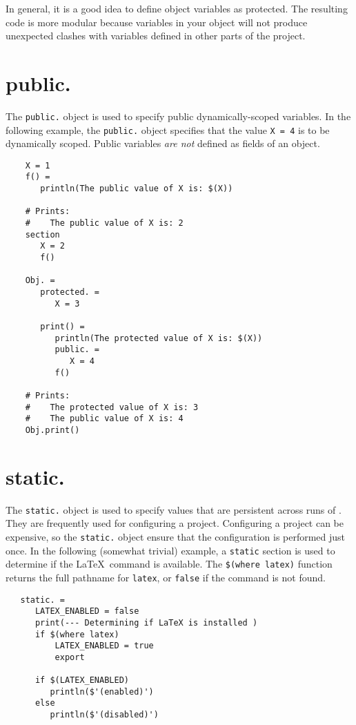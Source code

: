 In general, it is a good idea to define object variables as protected.  The resulting code is more
modular because variables in your object will not produce unexpected clashes with variables defined
in other parts of the project.

\section{public.}
\label{section:public}

The \verb+public.+ object is used to specify public dynamically-scoped variables.  In the following
example, the \verb+public.+ object specifies that the value \verb+X = 4+ is to be dynamically
scoped.  Public variables \emph{are not} defined as fields of an object.

\begin{verbatim}
    X = 1
    f() =
       println(The public value of X is: $(X))

    # Prints:
    #    The public value of X is: 2
    section
       X = 2
       f()

    Obj. =
       protected. =
          X = 3

       print() =
          println(The protected value of X is: $(X))
          public. =
             X = 4
          f()

    # Prints:
    #    The protected value of X is: 3
    #    The public value of X is: 4
    Obj.print()
\end{verbatim}

\section{static.}
\label{section:static.}

The \verb+static.+ object is used to specify values that are persistent across runs of \OMake{}.  They
are frequently used for configuring a project.  Configuring a project can be expensive, so the
\verb+static.+ object ensure that the configuration is performed just once.  In the following
(somewhat trivial) example, a \verb+static+ section is used to determine if the \LaTeX\ command is
available.  The \verb+$(where latex)+ function returns the full pathname for \verb+latex+, or
\verb+false+ if the command is not found.

\begin{verbatim}
   static. =
      LATEX_ENABLED = false
      print(--- Determining if LaTeX is installed )
      if $(where latex)
          LATEX_ENABLED = true
          export

      if $(LATEX_ENABLED)
         println($'(enabled)')
      else
         println($'(disabled)')
\end{verbatim}

